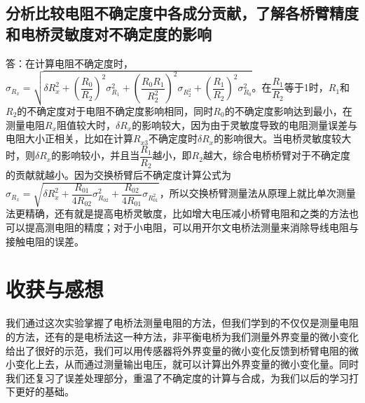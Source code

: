 \documentclass[a4 paper,12pt]{article}
\begin{document}
\subsection{分析比较电阻不确定度中各成分贡献，了解各桥臂精度和电桥灵敏度对不确定度的影响}
答：在计算电阻不确定度时，$\sigma_{R_{x}}=\sqrt{\delta R_{x}^{2}+(\dfrac{R_{0}}{R_{2}})^{2}\sigma_{R_{1}}^{2}+(\dfrac{R_{0}R_{1}}{R_{2}^{2}})^{2}\sigma_{R_{2}^{2}}+(\dfrac{R_{1}}{R_{2}})^{2}\sigma_{R_{0}}^{2}}$。在$\dfrac{R_{1}}{R_{2}}$等于1时，$R_{1}$和$R_{2}$的不确定度对于电阻不确定度影响相同，同时$R_{0}$的不确定度影响达到最小，在测量电阻$R_{x}$阻值较大时，$\delta R_{x}$的影响较大，因为由于灵敏度导致的电阻测量误差与电阻大小正相关，比如在计算$R_{x3}$不确定度时$\delta R_{x}$的影响很大。当电桥灵敏度较大时，则$\delta R_{x}$的影响较小，并且当$\dfrac{R_{1}}{R_{2}}$越小，即$R_{2}$越大，综合电桥桥臂对于不确定度的贡献就越小。因为交换桥臂后不确定度计算公式为$\sigma_{R_{x}}=\sqrt{\delta R_{x}^{2}+\dfrac{R_{01}}{4R_{02}}\sigma_{R_{02}}^{2}+\dfrac{R_{02}}{4R_{01}}\sigma_{R_{01}^{2}}}$，所以交换桥臂测量法从原理上就比单次测量法更精确，还有就是提高电桥灵敏度，比如增大电压减小桥臂电阻和之类的方法也可以提高测电阻的精度；对于小电阻，可以用开尔文电桥法测量来消除导线电阻与接触电阻的误差。
\section{收获与感想}
我们通过这次实验掌握了电桥法测量电阻的方法，但我们学到的不仅仅是测量电阻的方法，还有的是电桥法这一种方法，非平衡电桥为我们测量外界变量的微小变化给出了很好的示范，我们可以用传感器将外界变量的微小变化反馈到桥臂电阻的微小变化上去，从而通过测量输出电压，就可以计算出外界变量的微小变化量。同时我们还复习了误差处理部分，重温了不确定度的计算与合成，为我们以后的学习打下更好的基础。
\end{document}
